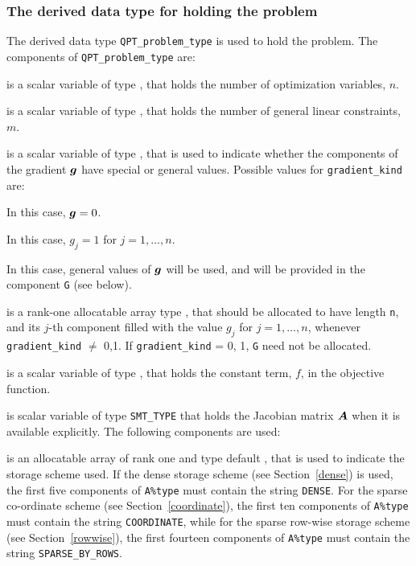 \documentclass{galahad}
\begin{document}
\subsubsection{The derived data type for holding the problem}\label{typeprob}
The derived data type {\tt QPT\_problem\_type} is used to hold
the problem. The components of
{\tt QPT\_problem\_type}
are:

\begin{description}

 is a scalar variable of type \integer,
 that holds the number of optimization variables, $n$.

 is a scalar variable of type \integer,
 that holds the number of general linear constraints, $m$.

 is a scalar variable of type \integer,
that is used to indicate whether the components of the gradient ${\bm{g}}$
have special or general values. Possible values for {\tt gradient\_kind} are:
\begin{description}
  In this case, ${\bm{g}} = 0$.

 In this case, $g_{j} = 1$ for $j = 1, \ldots , n$.

 In this case, general values of ${\bm{g}}$ will be used,
     and will be provided in the component {\tt G} (see below).
\end{description}

 is a rank-one allocatable array type \realdp, that
should be allocated to have length {\tt n}, and its $j$-th component
filled with the value $g_{j}$ for $j = 1, \ldots , n$,
whenever {\tt gradient\_kind} $\neq$ 0,1.
If {\tt gradient\_kind} {= 0, 1}, {\tt G} need not be allocated.

 is a scalar variable of type
\realdp, that holds
the constant term, $f$, in the objective function.

 is scalar variable of type {\tt SMT\_TYPE}
that holds the Jacobian matrix ${\bm{A}}$ when it is available explicitly.
The following components are used:

\begin{description}

 is an allocatable array of rank one and type default \character,
that is used to indicate the storage scheme used. If the dense storage scheme
(see Section~\ref{dense}) is used,
the first five components of {\tt A\%type} must contain the
string {\tt DENSE}.
For the sparse co-ordinate scheme (see Section~\ref{coordinate}),
the first ten components of {\tt A\%type} must contain the
string {\tt COORDINATE}, while
for the sparse row-wise storage scheme (see Section~\ref{rowwise}),
the first fourteen components of {\tt A\%type} must contain the
string {\tt SPARSE\_BY\_ROWS}.


\end{description}
\end{description}
\end{document}
